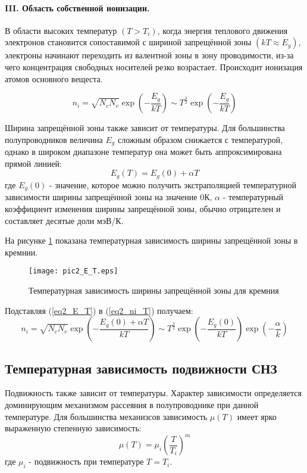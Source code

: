 \paragraph{III. Область собственной ионизации.}
В области высоких температур $(T > T_{i})$, когда энергия теплового движения электронов становится сопоставимой с шириной запрещённой зоны $(k T \approx E_{g})$, электроны начинают переходить из валентной зоны в зону проводимости, из-за чего концентрация свободных носителей резко возрастает. Происходит ионизация атомов основного вещеста.

\begin{equation}
n_{i} = \sqrt{N_{c} N_{v}} \exp{\left( -\frac{E_{g}}{k T} \right)} \sim T^{\frac{3}{2}} \exp{\left( -\frac{E_{g}}{k T} \right)}
\label{eq2_ni_T}
\end{equation}

Ширина запрещённой зоны также зависит от температуры. Для большинства полупроводников величина $E_{g}$ сложным образом снижается с температурой, однако в широком диапазоне температур она может быть аппроксимирована прямой линией:
\begin{equation}
E_{g}(T) = E_{g}(0) + \alpha T
\label{eq2_E_T}
\end{equation}
где $E_{g}(0)$ - значение, которое можно получить экстраполяцией температурной зависимости ширины запрещённой зоны на значение 0\textdegree К, $\alpha$ - температурный коэффициент изменения ширины запрещённой зоны, обычно отрицателен и составляет десятые доли мэВ/К.

На рисунке \ref{pic2_E_T} показана температурная зависимость ширины запрещённой зоны в кремнии.

\begin{figure}[h!]\centering
\texttt{[image: pic2\_E\_T.eps]}
\caption{Температурная зависимость ширины запрещённой зоны для кремния}
\label{pic2_E_T}
\end{figure}

Подставляя (\ref{eq2_E_T}) в (\ref{eq2_ni_T}) получаем:
\begin{equation}
n_{i} = \sqrt{N_{c} N_{v}} \exp{\left( -\frac{E_{g}(0) + \alpha T}{k T} \right)} \sim T^{\frac{3}{2}} \exp{\left( -\frac{E_{g}(0)}{k T} \right)} \exp{\left( -\frac{\alpha}{k} \right)}
\label{eq2_ni_T}
\end{equation}

\subsection{Температурная зависимость подвижности СНЗ}
Подвижность также зависит от температуры. Характер зависимости определяется доминирующим механизмом рассеяния в полупроводнике при данной температуре. Для большинства механизсов зависимость $\mu(T)$ имеет ярко выраженную степенную зависимость:
\begin{equation}
\mu(T) = \mu_{i} \left( \frac{T}{T_{i}} \right)^{m}
\end{equation}
где $\mu_{i}$ - подвижность при температуре $T = T_{i}$.

